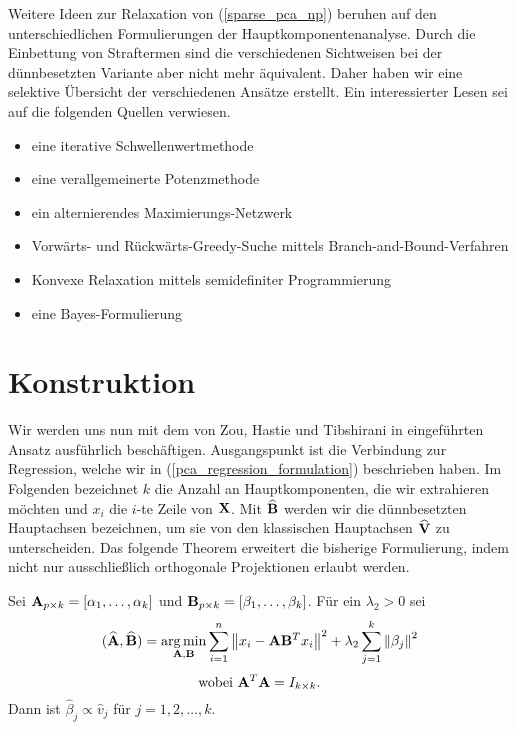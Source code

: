 Weitere Ideen zur Relaxation von (\ref{sparse_pca_np}) beruhen auf den unterschiedlichen Formulierungen der Hauptkomponentenanalyse. Durch die Einbettung von Straftermen sind die verschiedenen Sichtweisen bei der dünnbesetzten Variante aber nicht mehr äquivalent. Daher haben wir eine selektive Übersicht der verschiedenen Ansätze erstellt. Ein interessierter Lesen sei auf die folgenden Quellen verwiesen.
\begin{itemize}
\item eine iterative Schwellenwertmethode \cite{shen, witten}
\item eine verallgemeinerte Potenzmethode \cite{journee}
\item ein alternierendes Maximierungs-Netzwerk \cite{richtarik}
\item Vorwärts- und Rückwärts-Greedy-Suche mittels Branch-and-Bound-Verfahren \cite{moghaddam}
\item Konvexe Relaxation mittels semidefiniter Programmierung \cite{daspremont_semidefinite}
\item eine Bayes-Formulierung \cite{guan}
\end{itemize}




\section{Konstruktion}
\label{construction}

Wir werden uns nun mit dem von Zou, Hastie und Tibshirani in \cite{zou_sparsepca} eingeführten Ansatz ausführlich beschäftigen. Ausgangspunkt ist die Verbindung zur Regression, welche wir in (\ref{pca_regression_formulation}) beschrieben haben. Im Folgenden bezeichnet $k$ die Anzahl an Hauptkomponenten, die wir extrahieren möchten und $x_i$ die $i$-te Zeile von $\mathbf{X}$. Mit $\widehat{\mathbf{B}}$ werden wir die dünnbesetzten Hauptachsen bezeichnen, um sie von den klassischen Hauptachsen $\widehat{\mathbf{V}}$ zu unterscheiden. Das folgende Theorem erweitert die bisherige Formulierung, indem nicht nur ausschließlich orthogonale Projektionen erlaubt werden. 

\begin{thm} \label{pca_regression_formulation_ridge}
Sei $\mathbf{A}_{p \times k} = [ \alpha_1, \ldots ,\alpha_k ]$ und $\mathbf{B}_{p \times k} = [ \beta_1, \ldots ,\beta_k ]$. Für ein $\lambda_2 > 0$ sei
$$(\widehat{\mathbf{A}}, \widehat{\mathbf{B}}) = \operatorname*{arg\,min}_{\mathbf{A}, \mathbf{B}} \sum_{i=1}^{n} \left\lVert x_i - \mathbf{A}\mathbf{B}^Tx_i \right\rVert^2 + \lambda_2 \sum_{j=1}^{k}\left\lVert \beta_j \right\rVert^2$$
$$\text{wobei } \mathbf{A}^T\mathbf{A} = I_{k \times k}.$$
Dann ist $\widehat{\beta}_j \propto \widehat{v}_j$ für $j = 1,2,\ldots,k$. 
\end{thm}

